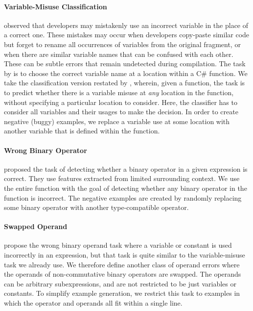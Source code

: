 \documentclass{article}
\begin{document}
\paragraph{Variable-Misuse {Classification}}
\citet{graphsiclr2018} observed that developers may mistakenly use an incorrect variable in the place of a correct one. These mistakes may occur when developers copy-paste similar code but forget to rename all occurrences of variables from the original fragment, or when there are similar variable names that can be confused with each other. These can be subtle errors that remain undetected during compilation. The task by \citet{graphsiclr2018} is to choose the correct variable name at a location within a C\# function. We take the classification version restated by \citet{DBLP:journals/corr/abs-1904-01720}, wherein, given a function, the task is to predict whether there is a variable misuse at \emph{any} location in the function, without specifying a particular location to consider. Here, the classifier has to consider all variables and their usages to make the decision. In order to create negative (buggy) examples, we replace a variable use at some location with another variable that is defined within the function.

\paragraph{Wrong Binary Operator}
\citet{Pradel:2018:DLA:3288538.3276517} proposed the task of detecting whether a binary operator in a given expression is correct. They use features extracted from limited surrounding context. We use the entire function with the goal of detecting whether any binary operator in the function is incorrect. The negative examples are created by randomly replacing some binary operator with another type-compatible operator.

\paragraph{Swapped Operand}
\citet{Pradel:2018:DLA:3288538.3276517} propose the wrong binary operand task where a variable or constant is used incorrectly in an expression, but that task is quite similar to the variable-misuse task we already use.
We therefore define another class of operand errors where the operands of non-commutative binary operators are swapped. The operands can be arbitrary subexpressions, and are not restricted to be just variables or constants.  To simplify example generation, we restrict this task to examples in which the operator and operands all fit within a single line. 
\end{document}
